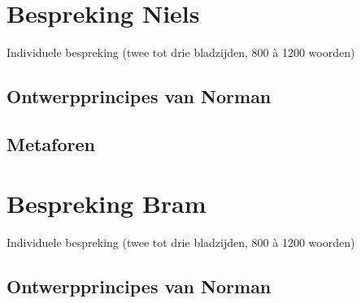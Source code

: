 \documentclass[11pt]{article}
\begin{document}
\section{Bespreking Niels}
Individuele bespreking (twee tot drie bladzijden, 800 à 1200 woorden)
\subsection{Ontwerpprincipes van Norman}

\subsection{Metaforen}
\newpage

\section{Bespreking Bram}
Individuele bespreking (twee tot drie bladzijden, 800 à 1200 woorden)
\subsection{Ontwerpprincipes van Norman}
\end{document}
